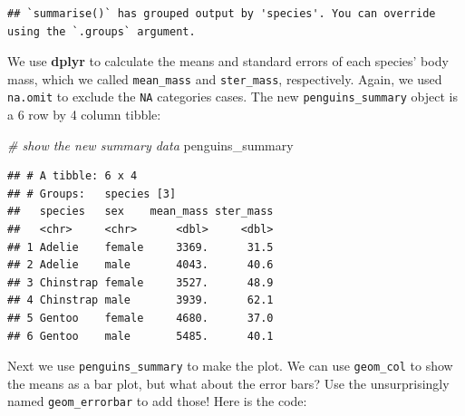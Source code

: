 \documentclass[
]{book}
\newenvironment{Shaded}{\begin{snugshade}}{\end{snugshade}}
\newcommand{\CommentTok}[1]{\textcolor[rgb]{0.56,0.35,0.01}{\textit{#1}}}
\newcommand{\NormalTok}[1]{#1}
\begin{document}
\begin{verbatim}
## `summarise()` has grouped output by 'species'. You can override using the `.groups` argument.
\end{verbatim}

We use \textbf{dplyr} to calculate the means and standard errors of each species' body mass, which we called \texttt{mean\_mass} and \texttt{ster\_mass}, respectively. Again, we used \texttt{na.omit} to exclude the \texttt{NA} categories cases. The new \texttt{penguins\_summary} object is a 6 row by 4 column tibble:

\begin{Shaded}
\begin{Highlighting}[]
\CommentTok{\# show the new summary data}
\NormalTok{penguins\_summary}
\end{Highlighting}
\end{Shaded}

\begin{verbatim}
## # A tibble: 6 x 4
## # Groups:   species [3]
##   species   sex    mean_mass ster_mass
##   <chr>     <chr>      <dbl>     <dbl>
## 1 Adelie    female     3369.      31.5
## 2 Adelie    male       4043.      40.6
## 3 Chinstrap female     3527.      48.9
## 4 Chinstrap male       3939.      62.1
## 5 Gentoo    female     4680.      37.0
## 6 Gentoo    male       5485.      40.1
\end{verbatim}

Next we use \texttt{penguins\_summary} to make the plot. We can use \texttt{geom\_col} to show the means as a bar plot, but what about the error bars? Use the unsurprisingly named \texttt{geom\_errorbar} to add those! Here is the code:
\end{document}
